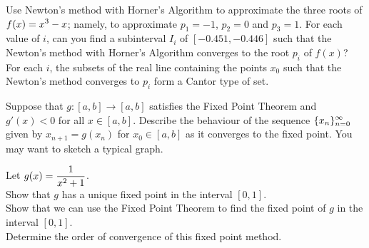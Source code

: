 \begin{question}
Use Newton's method with Horner's Algorithm to approximate the
three roots of $\displaystyle f(x) = x^3 -x$; namely, to approximate $p_1=-1$,
$p_2=0$ and $p_3=1$.  For each value of $i$, can you find a subinterval
$I_i$ of $[-0.451,-0.446]$ such that the Newton's method with Horner's
Algorithm converges to the root $p_i$ of $f(x)$?  For each $i$,
the subsets of the real line containing the points $x_0$ such that
the Newton's method converges to $p_i$ form a Cantor type of set.
\end{question}

\begin{question}
Suppose that $g:[a,b] \rightarrow [a,b]$ satisfies the Fixed Point
Theorem and $g'(x) < 0$ for all $x \in [a,b]$.  Describe the behaviour
of the sequence $\displaystyle \{ x_n\}_{n=0}^\infty$ given by $x_{n+1} = g(x_n)$
for $x_0 \in [a,b]$ as it converges to the fixed point.  You may want
to sketch a typical graph.
\end{question}

\begin{question}
Let $\displaystyle g(x) = \frac{1}{x^2+1}$.\\
 Show that $g$ has a unique fixed point in the interval $[0,1]$.\\
 Show that we can use the Fixed Point Theorem to find the
fixed point of $g$ in the interval $[0,1]$.\\
 Determine the order of convergence of this fixed point method.
\end{question}

